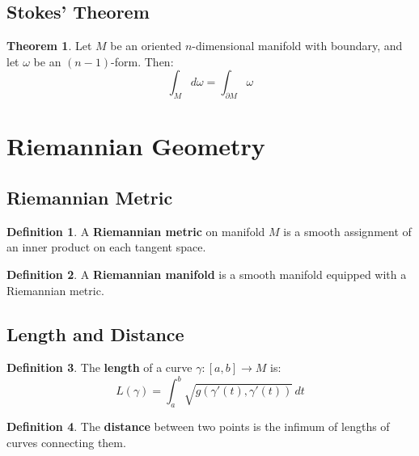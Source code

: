 \documentclass[11pt]{article}
\theoremstyle{definition}
\newtheorem{definition}{Definition}[section]
\newtheorem{theorem}{Theorem}[section]
\begin{document}
\subsection{Stokes' Theorem}
\begin{theorem}
Let $M$ be an oriented $n$-dimensional manifold with boundary, and let $\omega$ be an $(n-1)$-form. Then:
$$\int_M d\omega = \int_{\partial M} \omega$$
\end{theorem}

\section{Riemannian Geometry}

\subsection{Riemannian Metric}
\begin{definition}
A \textbf{Riemannian metric} on manifold $M$ is a smooth assignment of an inner product on each tangent space.
\end{definition}

\begin{definition}
A \textbf{Riemannian manifold} is a smooth manifold equipped with a Riemannian metric.
\end{definition}

\subsection{Length and Distance}
\begin{definition}
The \textbf{length} of a curve $\gamma: [a,b] \to M$ is:
$$L(\gamma) = \int_a^b \sqrt{g(\gamma'(t), \gamma'(t))} \, dt$$
\end{definition}

\begin{definition}
The \textbf{distance} between two points is the infimum of lengths of curves connecting them.
\end{definition}
\end{document}
